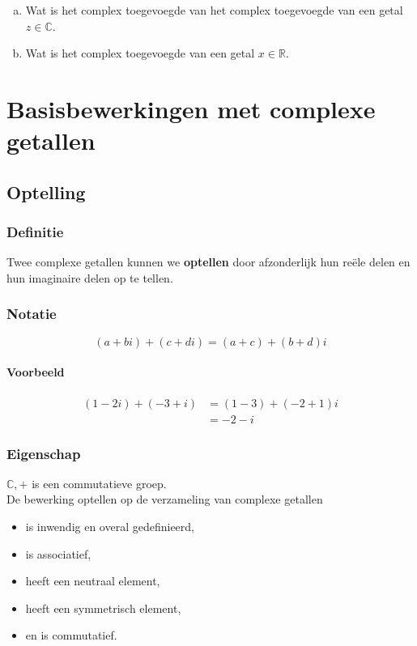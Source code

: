 \documentclass[12pt,twoside,a4paper]{article}
\begin{document}
\begin{oefening}
\begin{enumerate}[(a)]
  \item Wat is het complex toegevoegde van het complex toegevoegde van een getal $z\in\mathbb{C}$.
  \item Wat is het complex toegevoegde van een getal $x\in\mathbb{R}$.
\end{enumerate}
\end{oefening}

\cleardoublepage
\section{Basisbewerkingen met complexe getallen}

\subsection{Optelling}

\subsubsection*{Definitie}
\begin{mdframed}
Twee complexe getallen kunnen we {\bf optellen} door afzonderlijk hun reële delen en hun imaginaire delen op te tellen.
\end{mdframed}

\subsubsection*{Notatie}
$$(a+bi) + (c+di) = (a+c) + (b+d)i$$

\paragraph{Voorbeeld}
\begin{align*}
  (1 - 2i) + (-3 + i) &= (1 - 3) + (-2 + 1)i \\
                      &= -2-i
\end{align*}

\subsubsection*{Eigenschap}
$\mathbb{C},+$ is een commutatieve groep.\\
De bewerking optellen op de verzameling van complexe getallen
\begin{itemize}
  \item is inwendig en overal gedefinieerd,
  \item is associatief,
  \item heeft een neutraal element,
  \item heeft een symmetrisch element,
  \item en is commutatief.
\end{itemize}
\end{document}
